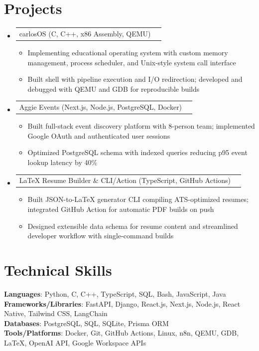 \documentclass[letterpaper,11pt]{article}
\makeatletter
\newcommand{\resumeItem}[1]{
  \item\small{{#1 \vspace{-2pt}}}
}
\newcommand{\resumeProjectHeading}[2]{
    \item
    \begin{tabular*}{0.97\textwidth}{l@{\extracolsep{\fill}}r}
      \small#1 & #2 \\
    \end{tabular*}\vspace{-7pt}
}
\newcommand{\resumeSubHeadingListStart}{\begin{itemize}[leftmargin=0.15in, label={}]}
\newcommand{\resumeSubHeadingListEnd}{\end{itemize}}
\newcommand{\resumeItemListStart}{\begin{itemize}}
\newcommand{\resumeItemListEnd}{\end{itemize}\vspace{-5pt}}
\makeatother
\begin{document}
\section{Projects}
\resumeSubHeadingListStart
  \resumeProjectHeading
    {carlosOS (C, C++, x86 Assembly, QEMU)}{}
    \resumeItemListStart
      \resumeItem{Implementing educational operating system with custom memory management, process scheduler, and Unix-style system call interface}
      \resumeItem{Built shell with pipeline execution and I/O redirection; developed and debugged with QEMU and GDB for reproducible builds}
    \resumeItemListEnd

  \resumeProjectHeading
    {Aggie Events (Next.js, Node.js, PostgreSQL, Docker)}{}
    \resumeItemListStart
      \resumeItem{Built full-stack event discovery platform with 8-person team; implemented Google OAuth and authenticated user sessions}
      \resumeItem{Optimized PostgreSQL schema with indexed queries reducing p95 event lookup latency by 40\%}
    \resumeItemListEnd

  \resumeProjectHeading
    {LaTeX Resume Builder \& CLI/Action (TypeScript, GitHub Actions)}{}
    \resumeItemListStart
      \resumeItem{Built JSON-to-LaTeX generator CLI compiling ATS-optimized resumes; integrated GitHub Action for automatic PDF builds on push}
      \resumeItem{Designed extensible data schema for resume content and streamlined developer workflow with single-command builds}
    \resumeItemListEnd
\resumeSubHeadingListEnd

\section{Technical Skills}
\begin{itemize}[leftmargin=0.15in, label={}]
  \small{\item{
    \textbf{Languages}{: Python, C, C++, TypeScript, SQL, Bash, JavaScript, Java} \\
    \textbf{Frameworks/Libraries}{: FastAPI, Django, React.js, Next.js, Node.js, React Native, Tailwind CSS, LangChain} \\
    \textbf{Databases}{: PostgreSQL, SQL, SQLite, Prisma ORM} \\
    \textbf{Tools/Platforms}{: Docker, Git, GitHub Actions, Linux, n8n, QEMU, GDB, LaTeX, OpenAI API, Google Workspace APIs}
  }}
\end{itemize}
\end{document}

